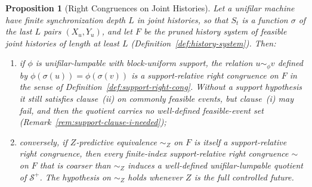 \documentclass[12pt]{article}
\newtheorem{proposition}[theorem]{Proposition}
\theoremstyle{definition}
\newcommand{\Splus}{\mathcal S^{+}}
\begin{document}
\begin{proposition}[Right Congruences on Joint Histories]
\label{prop:unifilar-lumpability}
Let a unifilar machine have finite synchronization depth $L$ in joint
histories, so that $S_t$ is a function $\sigma$ of the last $L$ pairs
$(X_u,Y_u)$, and let $F$ be the pruned history system of feasible joint
histories of length at least $L$
(Definition~\ref{def:history-system}).  Then:
\begin{enumerate}[label=(\roman*)]
\item if $\phi$ is unifilar-lumpable with block-uniform support, the relation
$u\sim_\phi v$ defined by $\phi(\sigma(u))=\phi(\sigma(v))$ is a
support-relative right congruence on $F$ in the sense of
Definition~\ref{def:support-right-cong}.  Without a support hypothesis it
still satisfies clause~(ii) on commonly feasible events, but clause~(i) may
fail, and then the quotient carries no well-defined feasible-event set
(Remark~\ref{rem:support-clause-i-needed});
\item conversely, if $Z$-predictive equivalence $\sim_Z$ on $F$ is itself a
support-relative right congruence, then every finite-index support-relative
right congruence $\sim$ on $F$ that is \emph{coarser} than $\sim_Z$ induces a
well-defined unifilar-lumpable quotient of $\Splus$.  The hypothesis on
$\sim_Z$ holds whenever $Z$ is the full controlled future.
\end{enumerate}
\end{proposition}
\end{document}
